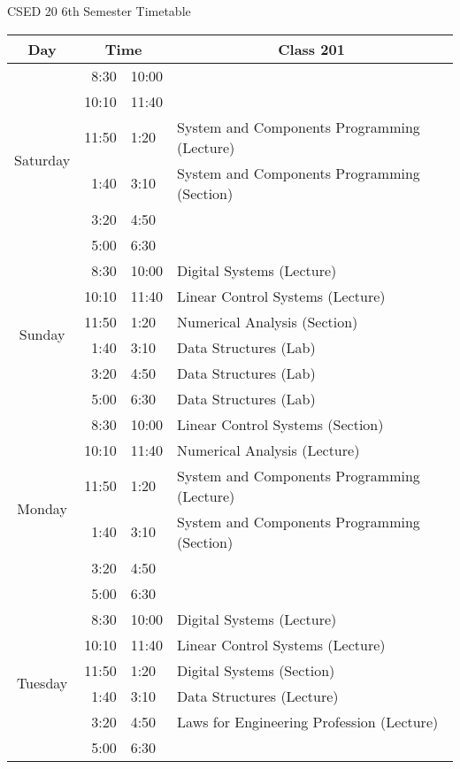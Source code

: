 \documentclass{article}
\begin{document}
\begin{table}[!htbp]
\centering
CSED 20 6th Semester Timetable
\begin{tabular}{|c|r l|l|}
\toprule
Day &  \multicolumn{2}{c|}{Time} & \multicolumn{1}{c|}{Class 201} \\

\midrule
\midrule
\multirow{6}{*}{Saturday}   &  8:30 & 10:00 & \\
                            & 10:10 & 11:40 & \\
                            & 11:50 &  1:20 & System and Components Programming (Lecture)\\
                            &  1:40 &  3:10 & System and Components Programming (Section)\\
                            &  3:20 &  4:50 & \\
                            &  5:00 &  6:30 & \\

\midrule
\multirow{6}{*}{Sunday}     &  8:30 & 10:00 & Digital Systems (Lecture)\\
                            & 10:10 & 11:40 & Linear Control Systems (Lecture)\\
                            & 11:50 &  1:20 & Numerical Analysis (Section)\\
                            &  1:40 &  3:10 & Data Structures (Lab)\\
                            &  3:20 &  4:50 & Data Structures (Lab)\\
                            &  5:00 &  6:30 & Data Structures (Lab)\\

\midrule
\multirow{6}{*}{Monday}     &  8:30 & 10:00 & Linear Control Systems (Section)\\
                            & 10:10 & 11:40 & Numerical Analysis (Lecture)\\
                            & 11:50 &  1:20 & System and Components Programming (Lecture)\\
                            &  1:40 &  3:10 & System and Components Programming (Section)\\
                            &  3:20 &  4:50 & \\
                            &  5:00 &  6:30 & \\

\midrule
\multirow{6}{*}{Tuesday}    &  8:30 & 10:00 & Digital Systems (Lecture)\\
                            & 10:10 & 11:40 & Linear Control Systems (Lecture)\\
                            & 11:50 &  1:20 & Digital Systems (Section)\\
                            &  1:40 &  3:10 & Data Structures (Lecture)\\
                            &  3:20 &  4:50 & Laws for Engineering Profession (Lecture)\\
                            &  5:00 &  6:30 & \\


\end{tabular}
\end{table}
\end{document}
